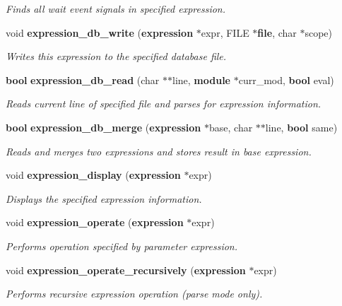 \begin{CompactItemize}
\begin{CompactList}\small\item\em Finds all wait event signals in specified expression. \item\end{CompactList}\item 
void {\bf expression\_\-db\_\-write} ({\bf expression} $\ast$expr, FILE $\ast${\bf file}, char $\ast$scope)
\begin{CompactList}\small\item\em Writes this expression to the specified database file. \item\end{CompactList}\item 
{\bf bool} {\bf expression\_\-db\_\-read} (char $\ast$$\ast$line, {\bf module} $\ast$curr\_\-mod, {\bf bool} eval)
\begin{CompactList}\small\item\em Reads current line of specified file and parses for expression information. \item\end{CompactList}\item 
{\bf bool} {\bf expression\_\-db\_\-merge} ({\bf expression} $\ast$base, char $\ast$$\ast$line, {\bf bool} same)
\begin{CompactList}\small\item\em Reads and merges two expressions and stores result in base expression. \item\end{CompactList}\item 
void {\bf expression\_\-display} ({\bf expression} $\ast$expr)
\begin{CompactList}\small\item\em Displays the specified expression information. \item\end{CompactList}\item 
void {\bf expression\_\-operate} ({\bf expression} $\ast$expr)
\begin{CompactList}\small\item\em Performs operation specified by parameter expression. \item\end{CompactList}\item 
void {\bf expression\_\-operate\_\-recursively} ({\bf expression} $\ast$expr)
\begin{CompactList}\small\item\em Performs recursive expression operation (parse mode only). \item\end{CompactList}\item 

\end{CompactItemize}
